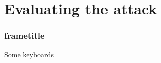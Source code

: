 \section{Evaluating the attack}

\begin{frame}
  \frametitle{frametitle}
%
Some keyboards
%
\end{frame}
